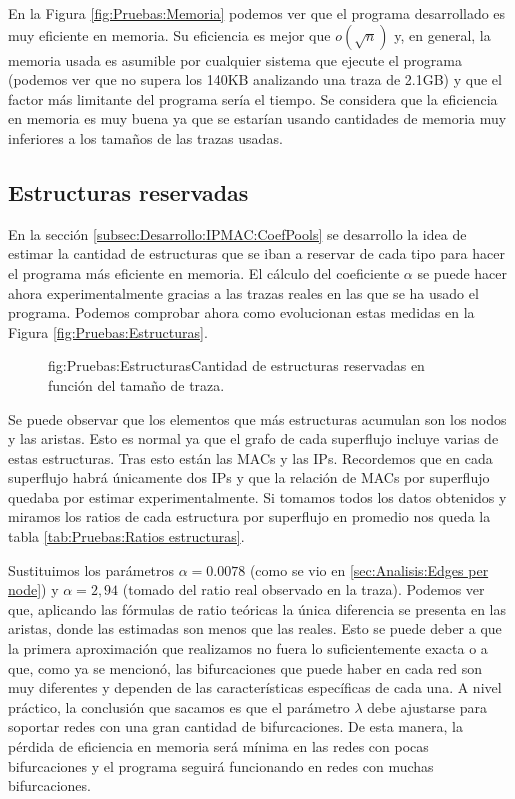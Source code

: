 \documentclass[tfg,epsbased,lof,lot,loa,covers,final,copyright,overleaf]{tfgtfmthesisuam}
\begin{document}
En la Figura \ref{fig:Pruebas:Memoria} podemos ver que el programa desarrollado es muy eficiente en memoria. Su eficiencia es mejor que $o(\sqrt{n})$ y, en general, la memoria usada es asumible por cualquier sistema que ejecute el programa (podemos ver que no supera los 140KB analizando una traza de 2.1GB) y que el factor más limitante del programa sería el tiempo. Se considera que la eficiencia en memoria es muy buena ya que se estarían usando cantidades de memoria muy inferiores a los tamaños de las trazas usadas. 

\subsection{Estructuras reservadas}
En la sección \ref{subsec:Desarrollo:IPMAC:CoefPools} se desarrollo la idea de estimar la cantidad de estructuras que se iban a reservar de cada tipo para hacer el programa más eficiente en memoria. El cálculo del coeficiente $\alpha$ se puede hacer ahora experimentalmente gracias a las trazas reales en las que se ha usado el programa. Podemos comprobar ahora como evolucionan estas medidas en la Figura \ref{fig:Pruebas:Estructuras}.


\begin{figure}[Gráfica de estructuras utilizadas]{fig:Pruebas:Estructuras}{Cantidad de estructuras reservadas en función del tamaño de traza.}
\end{figure}

Se puede observar que los elementos que más estructuras acumulan son los nodos y las aristas. Esto es normal ya que el grafo de cada superflujo incluye varias de estas estructuras. Tras esto están las MACs y las IPs. Recordemos que en cada superflujo habrá únicamente dos IPs y que la relación de MACs por superflujo quedaba por estimar experimentalmente. Si tomamos todos los datos obtenidos y miramos los ratios de cada estructura por superflujo en promedio nos queda la tabla \ref{tab:Pruebas:Ratios estructuras}.

Sustituimos los parámetros $\alpha = 0.0078$ (como se vio en \ref{sec:Analisis:Edges per node}) y $\alpha = 2,94$ (tomado del ratio real observado en la traza). Podemos ver que, aplicando las fórmulas de ratio teóricas la única diferencia se presenta en las aristas, donde las estimadas son menos que las reales. Esto se puede deber a que la primera aproximación que realizamos no fuera lo suficientemente exacta o a que, como ya se mencionó, las bifurcaciones que puede haber en cada red son muy diferentes y dependen de las características específicas de cada una. A nivel práctico, la conclusión que sacamos es que el parámetro $\lambda$ debe ajustarse para soportar redes con una gran cantidad de bifurcaciones. De esta manera, la pérdida de eficiencia en memoria será mínima en las redes con pocas bifurcaciones y el programa seguirá funcionando en redes con muchas bifurcaciones.
\end{document}
